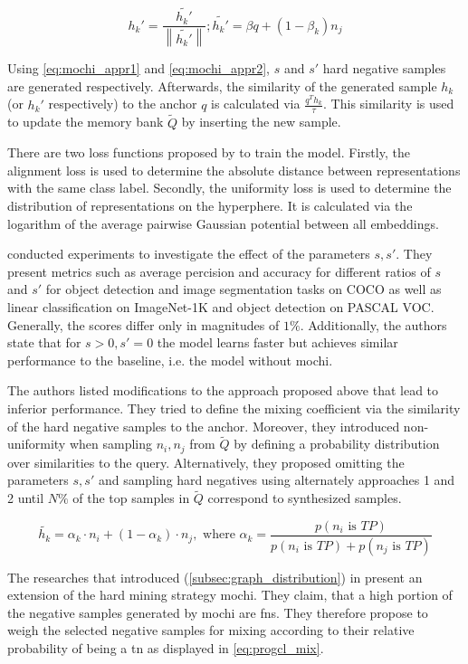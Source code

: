 \begin{equation}
    h_k' = \frac{\tilde{h_k'}}{\left\| \tilde{h_k'}  \right\|}; \tilde{h_k'} = \beta q + (1-\beta_k)n_j
    \label{eq:mochi_appr2}
\end{equation}

Using \eqref{eq:mochi_appr1} and \eqref{eq:mochi_appr2}, 
$s$ and $s'$ hard negative samples are generated respectively.
Afterwards, the similarity of the generated sample $h_k$ (or $h_k'$ respectively) 
to the anchor $q$ is calculated via $\frac{q^T h_k}{\tau}$.
This similarity is used to update the memory bank $\tilde{Q}$ 
by inserting the new sample.

There are two loss functions proposed by \citet{mochi_2020} to train the model.
Firstly, the alignment loss is used to determine 
the absolute distance between representations with the same class label.
Secondly, the uniformity loss is used to determine 
the distribution of representations on the hyperphere.
It is calculated via the logarithm of the average pairwise Gaussian potential between all embeddings.

\citet{mochi_2020} conducted experiments to investigate the effect of the parameters $s, s'$.
They present metrics such as average percision and accuracy for different ratios of $s$ and $s'$ 
for object detection and image segmentation tasks on COCO as well as 
linear classification on ImageNet-1K and object detection on PASCAL VOC.
Generally, the scores differ only in magnitudes of $1 \%$.
Additionally, the authors state that for $s > 0, s' = 0$ the model learns faster but achieves similar performance to the baseline, i.e. the model without \ac{mochi}.


The authors listed modifications to the approach proposed above that lead to inferior performance.
They tried to define the mixing coefficient via the similarity of the hard negative samples 
to the anchor. %
Moreover, they introduced non-uniformity when sampling $n_i, n_j$ from $\tilde{Q}$ by defining a 
probability distribution over similarities to the query. %
Alternatively, they proposed omitting the parameters $s, s'$ and 
sampling hard negatives using alternately approaches 1 and 2 until $N\%$ of the top samples in 
$\tilde{Q}$ correspond to synthesized samples.

\begin{equation}
    \tilde{h_k} =  \alpha_k \cdot n_i + (1-\alpha_k) \cdot  n_j, \text{ where } \alpha_k = \frac{p(n_i \text{ is } TP)}{p(n_i \text{ is } TP) + p(n_j \text{ is } TP)}
    \label{eq:progcl_mix}
\end{equation}

The researches that introduced \progcl{} (\autoref{subsec:graph_distribution}) in \citet{progcl_2022} 
present an extension of the hard mining strategy \ac{mochi}.%
They claim, that a high portion of the negative samples generated by \ac{mochi} are \acp{fn}.
They therefore propose to weigh the selected negative samples for mixing 
according to their relative probability of being a \ac{tn} as displayed in \eqref{eq:progcl_mix}.